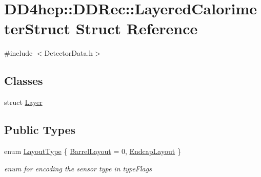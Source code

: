 \hypertarget{struct_d_d4hep_1_1_d_d_rec_1_1_layered_calorimeter_struct}{
\section{DD4hep::DDRec::LayeredCalorimeterStruct Struct Reference}
\label{struct_d_d4hep_1_1_d_d_rec_1_1_layered_calorimeter_struct}
}


{\ttfamily \#include $<$DetectorData.h$>$}\subsection*{Classes}
\begin{DoxyCompactItemize}
\item 
struct \hyperlink{struct_d_d4hep_1_1_d_d_rec_1_1_layered_calorimeter_struct_1_1_layer}{Layer}
\end{DoxyCompactItemize}
\subsection*{Public Types}
\begin{DoxyCompactItemize}
\item 
enum \hyperlink{struct_d_d4hep_1_1_d_d_rec_1_1_layered_calorimeter_struct_a560e60d5a6a1671ab8b21629714b4d36}{LayoutType} \{ \hyperlink{struct_d_d4hep_1_1_d_d_rec_1_1_layered_calorimeter_struct_a560e60d5a6a1671ab8b21629714b4d36a3fea4df83caa5f87e268860c1a31bd35}{BarrelLayout} = 0, 
\hyperlink{struct_d_d4hep_1_1_d_d_rec_1_1_layered_calorimeter_struct_a560e60d5a6a1671ab8b21629714b4d36a24acc3ffef033863537a6df507ffad72}{EndcapLayout}
 \}
\begin{DoxyCompactList}\small\item\em enum for encoding the sensor type in typeFlags \item\end{DoxyCompactList}\end{DoxyCompactItemize}
